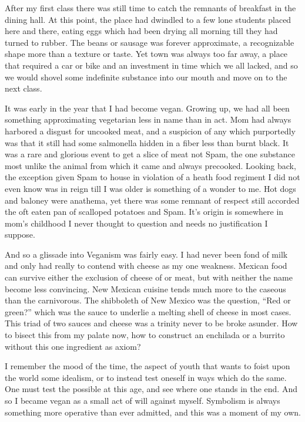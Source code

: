 \documentclass[ebook, 10pt, openright, onecolumn]{memoir}
\begin{document}
After my first class there was still time to catch the remnants of breakfast in
the dining hall.  At this point, the place had dwindled to a few lone students
placed here and there, eating eggs which had been drying all morning till they
had turned to rubber.  The beans or sausage was forever approximate, a
recognizable shape more than a texture or taste.  Yet town was always too far
away, a place that required a car or bike and an investment in time which we all
lacked, and so we would shovel some indefinite substance into our mouth and move
on to the next class.

It was early in the year that I had become vegan.  Growing up, we had all been
something approximating vegetarian less in name than in act. Mom had always
harbored a disgust for uncooked meat, and a suspicion of any which purportedly
was that it still had some salmonella hidden in a fiber less than burnt black.
It was a rare and glorious event to get a slice of meat not Spam, the one
substance most unlike the animal from which it came and always precooked.
Looking back, the exception given Spam to house in violation of a heath food
regiment I did not even know was in reign till I was older is something of a
wonder to me.  Hot dogs and baloney were anathema, yet there was some remnant of
respect still accorded the oft eaten pan of scalloped potatoes and Spam.  It's
origin is somewhere in mom's childhood I never thought to question and needs no
justification I suppose.

And so a glissade into Veganism was fairly easy.  I had never been fond of milk
and only had really to contend with cheese as my one weakness.  Mexican food can
survive either the exclusion of cheese of or meat, but with neither the name
become less convincing.  New Mexican cuisine tends much more to the caseous than
the carnivorous.  The shibboleth of New Mexico was the question, ``Red or
green?'' which was the sauce to underlie a melting shell of cheese in most
cases.  This triad of two sauces and cheese was a trinity never to be broke
asunder.  How to bisect this from my palate now, how to construct an enchilada
or a burrito without this one ingredient as axiom?

I remember the mood of the time, the aspect of youth that wants to foist upon
the world some idealism, or to instead test oneself in ways which do the same.
One must test the possible at this age, and see where one stands in the end.
And so I became vegan as a small act of will against myself.  Symbolism is
always something more operative than ever admitted, and this was a moment of
my own.
\end{document}
